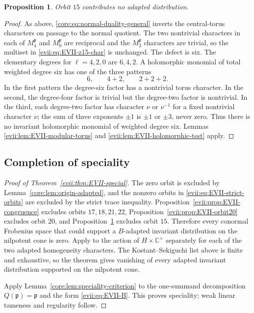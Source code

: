 \documentclass[10pt,a4paper]{amsart}
\numberwithin{equation}{section}
\newtheorem{proposition}[theorem]{Proposition}
\newcommand{\C}{\mathbb C}
\newcommand{\fp}{\mathfrak p}
\begin{document}
\begin{proposition}\label{evii:prop:EVII-orbit15}
Orbit $15$ contributes no adapted distribution.
\end{proposition}

\begin{proof}
As above, \eqref{core:eq:normal-duality-general} inverts the central-torus
characters on passage to the normal quotient.  The two nontrivial characters
in each of $M_4^{\fp}$ and $M_0^{\fp}$ are reciprocal and the $M_2^{\fp}$
characters are trivial, so the multiset in \eqref{evii:eq:EVII-z15-char} is
unchanged.  The defect is six.  The elementary degrees for $\ell=4,2,0$ are
$6,4,2$.  A holomorphic monomial of total weighted degree six has one of the
three patterns
\[
 6,
 \qquad
 4+2,
 \qquad
 2+2+2.
\]
In the first pattern the degree-six factor has a nontrivial torus character.
In the second, the degree-four factor is trivial but the degree-two factor is
nontrivial.  In the third, each degree-two factor has character $\nu$ or
$\nu^{-1}$ for a fixed nontrivial character $\nu$; the sum of three exponents
$\pm1$ is $\pm1$ or $\pm3$, never zero.  Thus there is no invariant
holomorphic monomial of weighted degree six.  Lemmas
\ref{evii:lem:EVII-modular-torus} and \ref{evii:lem:EVII-holomorphic-test} apply.
\end{proof}

\subsection{Completion of speciality}

\begin{proof}[Proof of Theorem~\ref{evii:thm:EVII-special}]
The zero orbit is excluded by Lemma~\ref{core:lem:origin-adapted}, and the
nonzero orbits in \eqref{evii:eq:EVII-strict-orbits} are excluded by the
strict trace inequality.  Proposition~\ref{evii:prop:EVII-congruence} excludes
orbits $17,18,21,22$, Proposition~\ref{evii:prop:EVII-orbit20} excludes orbit
$20$, and Proposition~\ref{evii:prop:EVII-orbit15} excludes orbit $15$.  Therefore
every conormal Frobenius space that could support a $B$-adapted invariant
distribution on the nilpotent cone is zero.  Apply
\cite[Theorem~2.5.6]{AG09} to the action of $H\times\C^\times$ separately
for each of the two adapted homogeneity characters.  The
Kostant--Sekiguchi list above is finite and exhaustive, so the theorem gives
vanishing of every adapted invariant distribution supported on the nilpotent
cone.

Apply Lemma~\ref{core:lem:speciality-criterion} to the one-summand decomposition
$Q(\fp)=\fp$ and the form \eqref{evii:eq:EVII-B}.  This proves speciality; weak
linear tameness and regularity follow.
\end{proof}
\end{document}
